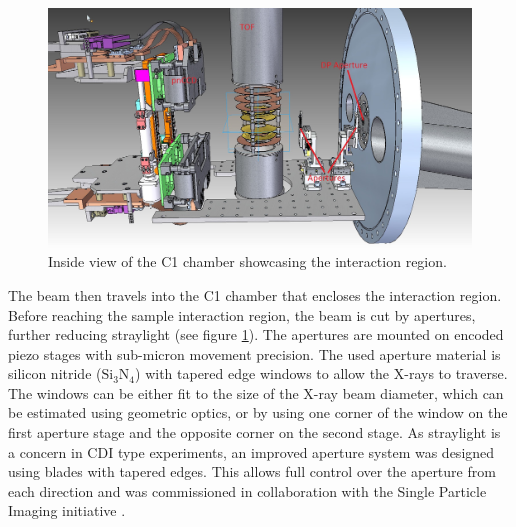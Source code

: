 \begin{figure}
	\centering
		\includegraphics[width=1.00\textwidth]{images/c1-ccd-spec.jpg}
	\caption{Inside view of the C1 chamber showcasing the interaction region.}
	\label{fig:c1-ccd-spec}
\end{figure}
The beam then travels into the C1 chamber that encloses the interaction region. Before reaching the sample interaction region, the beam is cut by apertures, further reducing straylight (see figure \ref{fig:c1-ccd-spec}). The apertures are mounted on encoded piezo stages with sub-micron movement precision. The used aperture material is silicon nitride ($\text{Si}_{3}\text{N}_{4}$) with tapered edge windows to allow the X-rays to traverse. The windows can be either fit to the size of the X-ray beam diameter, which can be estimated using geometric optics, or by using one corner of the window on the first aperture stage and the opposite corner on the second stage. As straylight is a concern in CDI type experiments, an improved aperture system was designed using blades with tapered edges. This allows full control over the aperture from each direction and was commissioned in collaboration with the Single Particle Imaging initiative \citep{SPI-2015-unpublished}.\\
